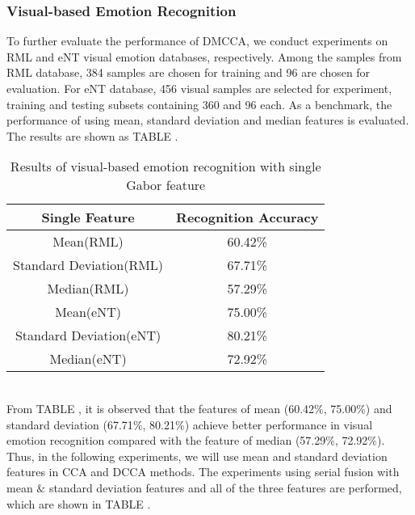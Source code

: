 \documentclass[journal]{IEEEtran}
\begin{document}
\subsubsection{Visual-based Emotion Recognition}
To further evaluate the performance of DMCCA, we conduct experiments on RML and eNT visual emotion databases, respectively. Among the samples from RML database, 384 samples are chosen for training and 96 are chosen for evaluation. For eNT database, 456 visual samples are selected for experiment, training and testing subsets containing 360 and 96 each. As a benchmark, the performance of using mean, standard deviation and median features is evaluated. The results are shown as TABLE \uppercase\expandafter{}.\\
\vspace*{-10pt}
\begin{table}[h]
\normalsize
\renewcommand{\arraystretch}{1.0}
\caption{\normalsize{Results of visual-based emotion recognition with single Gabor feature}}
\setlength{\abovecaptionskip}{0pt}
\setlength{\belowcaptionskip}{10pt}
\centering
\tabcolsep 0.073in
\begin{tabular}{cc}
\hline
Single Feature & Recognition Accuracy\\
\hline
Mean(RML) &60.42\%\\
Standard Deviation(RML) &67.71\%\\
Median(RML) &57.29\%\\
Mean(eNT) &75.00\%\\
Standard Deviation(eNT) &80.21\%\\
Median(eNT) &72.92\%\\
\hline
\end{tabular}
\end{table}\\

From TABLE \uppercase\expandafter{}, it is observed that the features of mean (60.42$\%$, 75.00$\%$) and standard deviation (67.71$\%$, 80.21$\%$) achieve better performance in visual emotion recognition compared with the feature of median (57.29$\%$, 72.92$\%$). Thus, in the following experiments, we will use mean and standard deviation features in CCA and DCCA methods. The experiments using serial fusion with mean $\&$ standard deviation features and all of the three features are performed, which are shown in TABLE \uppercase\expandafter{}.\\\indent
\end{document}
